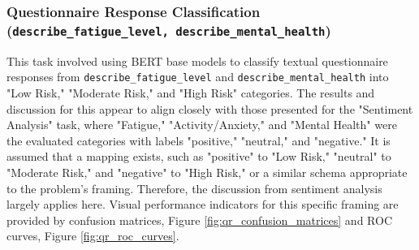 \subsubsection{Questionnaire Response Classification (\texttt{describe\_fatigue\_level, describe\_mental\_health})}

This task involved using BERT base models to classify textual questionnaire responses from \texttt{describe\_fatigue\_level} and \texttt{describe\_mental\_health} into "Low Risk," "Moderate Risk," and "High Risk" categories. The results and discussion for this appear to align closely with those presented for the "Sentiment Analysis" task, where "Fatigue," "Activity/Anxiety," and "Mental Health" were the evaluated categories with labels "positive," "neutral," and "negative." It is assumed that a mapping exists, such as "positive" to "Low Risk," "neutral" to "Moderate Risk," and "negative" to "High Risk," or a similar schema appropriate to the problem's framing. Therefore, the discussion from sentiment analysis largely applies here. Visual performance indicators for this specific framing are provided by confusion matrices, Figure \ref{fig:qr_confusion_matrices} and ROC curves, Figure \ref{fig:qr_roc_curves}.

